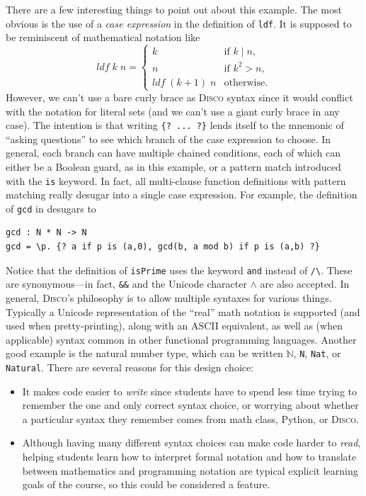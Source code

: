 \documentclass[submission,copyright,creativecommons]{eptcs}
\newcommand{\disco}{\textsc{Disco}\xspace}
\newcommand{\pref}[1]{\prettyref{#1}}
\newcommand{\N}{\mathbb{N}}
\begin{document}
\begin{listing}[!htp]
\inputminted{text}{examples/prime.disco}
\caption{Primality testing in \disco}
\label{lst:prime}
\end{listing}

There are a few interesting things to point out about this example.
The most obvious is the use of a \emph{case expression} in the
definition of \verb|ldf|.  It is supposed to be reminiscent of
mathematical notation like
\[ \mathit{ldf}\;k\;n = \begin{cases} k & \text{if } k \mid n, \\ n &
    \text{if } k^2 > n, \\ \mathit{ldf}\;(k+1)\;n &
    \text{otherwise.} \end{cases} \] However, we can't use a bare
curly brace as \disco syntax since it would conflict with the notation
for literal sets (and we can't use a giant curly brace in any case).
The intention is that writing %
\verb|{? ... ?}| lends itself to the mnemonic of ``asking questions''
to see which branch of the case expression to choose.  In general,
each branch can have multiple chained conditions, each of which can
either be a Boolean guard, as in this example, or a pattern match
introduced with the \verb|is| keyword.  In fact, all multi-clause
function definitions with pattern matching really desugar into a
single case expression. For example, the definition of \verb|gcd| in
\pref{lst:gcd} desugars to
\begin{verbatim}
gcd : N * N -> N
gcd = \p. {? a if p is (a,0), gcd(b, a mod b) if p is (a,b) ?}
\end{verbatim}

Notice that the definition of \verb|isPrime| uses the keyword
\verb|and| instead of \verb|/\|.  These are synonymous---in fact,
\verb|&&| and the Unicode character $\land$ are also accepted.  In
general, \disco's philosophy is to allow multiple syntaxes for various
things.  Typically a Unicode representation of the ``real'' math
notation is supported (and used when pretty-printing), along with an
ASCII equivalent, as well as (when applicable) syntax common in other
functional programming languages.  Another good example is the natural
number type, which can be written $\N$, \verb|N|, \verb|Nat|, or
\verb|Natural|.  There are several reasons for this design choice:
\begin{itemize}
\item It makes code easier to \emph{write} since students have to
  spend less time trying to remember the one and only correct syntax
  choice, or worrying about whether a particular syntax they remember
  comes from math class, Python, or \disco.
\item Although having many different syntax choices can make code
  harder to \emph{read}, helping students learn how to interpret
  formal notation and how to translate between mathematics and
  programming notation are typical explicit learning goals of the
  course, so this could be considered a feature.
\end{itemize}
\end{document}

